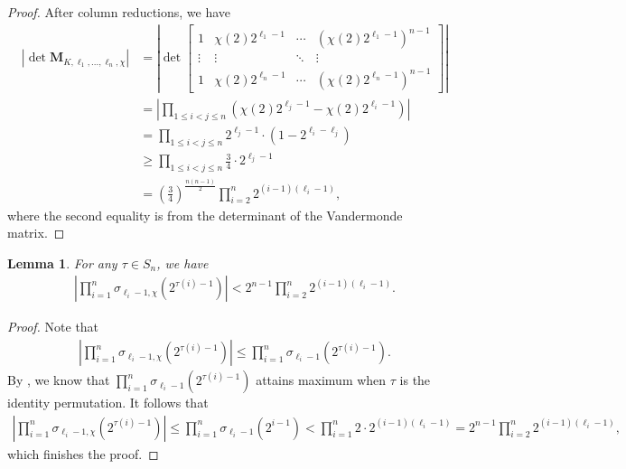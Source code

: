 \documentclass[11pt,letterpaper,reqno]{amsart}
\numberwithin{figure}{section}
\numberwithin{table}{section}
\theoremstyle{definition}
\theoremstyle{plain}
\newtheorem{lemma}[theorem]{Lemma}
\theoremstyle{definition}
\theoremstyle{definition}
\theoremstyle{remark}
\numberwithin{equation}{section}
\theoremstyle{remark}
\begin{document}
\begin{proof}
    After column reductions, we have 
\begin{align*}
\left|\det \mathbf{M}_{K,\ell_1,...,\ell_n,\chi}\right|&=\left|\det\begin{bmatrix}
        1 & \chi(2)2^{\ell_1-1}  & \cdots & (\chi(2)2^{\ell_1-1})^{n-1}\\
        \vdots  & \vdots & \ddots & \vdots\\ 
       1 & \chi(2)2^{\ell_{n}-1} &  \cdots & (\chi(2)2^{\ell_{n}-1})^{n-1}
    \end{bmatrix}\right|\\&=\left|\prod_{1\leq i<j\leq n}\left(\chi(2)2^{\ell_j-1}-\chi(2)2^{\ell_i-1}\right)\right|\\&=\prod_{1\leq i<j\leq n}2^{\ell_j-1}\cdot(1-2^{\ell_i-\ell_j})\\&\geq\prod_{1\leq i<j\leq n}\frac{3}{4}\cdot2^{\ell_j-1}\\&=\left(\frac{3}{4}\right)^{\frac{n(n-1)}{2}}\prod_{i=2}^n2^{(i-1)(\ell_i-1)},
\end{align*}
where the second equality is from the determinant of the Vandermonde matrix.
\end{proof}
\begin{lemma}
    For any $\tau\in S_n$, we have 
    \begin{align*}
        \left|\prod_{i=1}^n\sigma_{\ell_i-1,\chi}(2^{\tau(i)-1})\right|<2^{n-1}\prod_{i=2}^n2^{(i-1)(\ell_i-1)}.
    \end{align*}
\end{lemma}
\begin{proof}
    Note that
    \begin{align*}
        \left|\prod_{i=1}^n\sigma_{\ell_i-1,\chi}(2^{\tau(i)-1})\right|\leq\prod_{i=1}^n\sigma_{\ell_i-1}(2^{\tau(i)-1}).
    \end{align*}
    By \cite[Corollary 2.5]{oddperiods}, we know that 
   $\prod_{i=1}^n\sigma_{\ell_i-1}(2^{\tau(i)-1})$ attains maximum when $\tau$ is the identity permutation. It follows that
   \begin{align}
        \left|\prod_{i=1}^n\sigma_{\ell_i-1,\chi}(2^{\tau(i)-1})\right|\leq\prod_{i=1}^n\sigma_{\ell_i-1}(2^{i-1})<\prod_{i=1}^n2\cdot2^{(i-1)(\ell_i-1)}=2^{n-1}\prod_{i=2}^n2^{(i-1)(\ell_i-1)},\label{eq:midstep}
        \end{align}
        which finishes the proof.
\end{proof}
\end{document}
